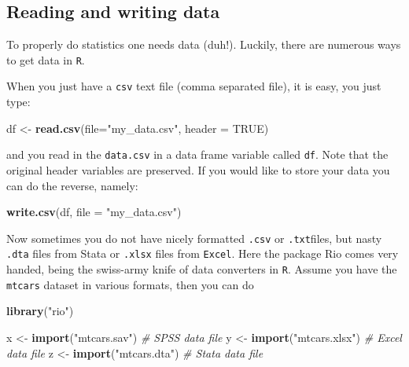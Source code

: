 \documentclass[]{article}
\newenvironment{Shaded}{\begin{snugshade}}{\end{snugshade}}
\newcommand{\KeywordTok}[1]{\textcolor[rgb]{0.13,0.29,0.53}{\textbf{#1}}}
\newcommand{\DataTypeTok}[1]{\textcolor[rgb]{0.13,0.29,0.53}{#1}}
\newcommand{\StringTok}[1]{\textcolor[rgb]{0.31,0.60,0.02}{#1}}
\newcommand{\CommentTok}[1]{\textcolor[rgb]{0.56,0.35,0.01}{\textit{#1}}}
\newcommand{\OtherTok}[1]{\textcolor[rgb]{0.56,0.35,0.01}{#1}}
\newcommand{\NormalTok}[1]{#1}
\theoremstyle{definition}
\theoremstyle{definition}
\theoremstyle{definition}
\theoremstyle{remark}
\begin{document}
\subsection{Reading and writing data}\label{reading-and-writing-data}

To properly do statistics one needs data (duh!). Luckily, there are
numerous ways to get data in \texttt{R}.

When you just have a \texttt{csv} text file (comma separated file), it
is easy, you just type:

\begin{Shaded}
\begin{Highlighting}[]
\NormalTok{df <-}\StringTok{ }\KeywordTok{read.csv}\NormalTok{(}\DataTypeTok{file=}\StringTok{"my_data.csv"}\NormalTok{, }\DataTypeTok{header =} \OtherTok{TRUE}\NormalTok{)}
\end{Highlighting}
\end{Shaded}

and you read in the \texttt{data.csv} in a data frame variable called
\texttt{df}. Note that the original header variables are preserved. If
you would like to store your data you can do the reverse, namely:

\begin{Shaded}
\begin{Highlighting}[]
\KeywordTok{write.csv}\NormalTok{(df, }\DataTypeTok{file =} \StringTok{"my_data.csv"}\NormalTok{)}
\end{Highlighting}
\end{Shaded}

Now sometimes you do not have nicely formatted \texttt{.csv} or
\texttt{.txt}files, but nasty \texttt{.dta} files from Stata or
\texttt{.xlsx} files from \texttt{Excel}. Here the package Rio comes
very handed, being the swiss-army knife of data converters in
\texttt{R}. Assume you have the \texttt{mtcars} dataset in various
formats, then you can do

\begin{Shaded}
\begin{Highlighting}[]
\KeywordTok{library}\NormalTok{(}\StringTok{"rio"}\NormalTok{)}

\NormalTok{x <-}\StringTok{ }\KeywordTok{import}\NormalTok{(}\StringTok{"mtcars.sav"}\NormalTok{)  }\CommentTok{# SPSS data file}
\NormalTok{y <-}\StringTok{ }\KeywordTok{import}\NormalTok{(}\StringTok{"mtcars.xlsx"}\NormalTok{) }\CommentTok{# Excel data file}
\NormalTok{z <-}\StringTok{ }\KeywordTok{import}\NormalTok{(}\StringTok{"mtcars.dta"}\NormalTok{)  }\CommentTok{# Stata data file}
\end{Highlighting}
\end{Shaded}
\end{document}
